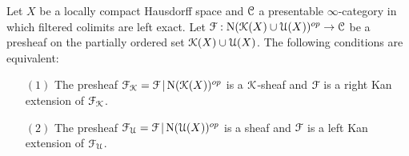 \begin{theorem}\label{kuku}
Let $X$ be a locally compact Hausdorff space and $\calC$ a presentable $\infty$-category in which filtered colimits are left exact.
Let $\calF: \Nerve (\calK(X) \cup \calU(X))^{op} \rightarrow \calC$ be a presheaf on the partially ordered set $\calK(X) \cup \calU(X)$.  
The following conditions are equivalent:
\begin{itemize}
\item[$(1)$] The presheaf $\calF_{\calK} = \calF| \Nerve(\calK(X))^{op}$ is a $\calK$-sheaf and $\calF$ is a right Kan extension of $\calF_{\calK}$.
\item[$(2)$] The presheaf $\calF_{\calU} = \calF | \Nerve(\calU(X))^{op}$ is a sheaf and $\calF$ is a left Kan extension of $\calF_{\calU}$.
\end{itemize}
\end{theorem}

